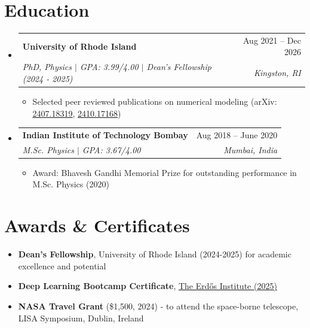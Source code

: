 \documentclass[letterpaper,10pt]{article}
\makeatletter
\newcommand{\resumeItem}[1]{
  \item\small{
    {#1 \vspace{-2pt}}
  }
}
\newcommand{\resumeSubheading}[4]{
  \vspace{-2pt}\item
    \begin{tabular*}{0.97\textwidth}[t]{l@{\extracolsep{\fill}}r}
      \textbf{#1} & #2 \\
      \textit{\small#3} & \textit{\small #4} \\
    \end{tabular*}\vspace{-7pt}
}
\newcommand{\resumeSubHeadingListStart}{\begin{itemize}[leftmargin=0.15in, label={}]}
\newcommand{\resumeSubHeadingListEnd}{\end{itemize}}
\newcommand{\resumeItemListStart}{\begin{itemize}}
\newcommand{\resumeItemListEnd}{\end{itemize}\vspace{-5pt}}
\makeatother
\begin{document}
\section{Education}
  \resumeSubHeadingListStart
    \resumeSubheading
      {University of Rhode Island}{Aug 2021 -- Dec 2026}
      {PhD, Physics $|$ GPA: 3.99/4.00 $|$ Dean's Fellowship (2024 - 2025)}{Kingston, RI}
      \resumeItemListStart
        \resumeItem{Selected peer reviewed publications on numerical modeling 
        (arXiv: \href{https://arxiv.org/abs/2407.18319}{\underline{2407.18319}}, 
        \href{https://arxiv.org/abs/2410.17168}{\underline{2410.17168}})}
      \resumeItemListEnd
    \resumeSubheading
      {Indian Institute of Technology Bombay}{Aug 2018 -- June 2020}
      {M.Sc. Physics $|$ GPA: 3.67/4.00}{Mumbai, India}
      \resumeItemListStart
        \resumeItem{Award: Bhavesh Gandhi Memorial Prize for outstanding performance in M.Sc. Physics (2020)}
      \resumeItemListEnd
  \resumeSubHeadingListEnd

\section{Awards \& Certificates}
  \begin{itemize}[leftmargin=0.15in, label={}, noitemsep]
      \item \textbf{Dean's Fellowship}, University of Rhode Island (2024-2025) for academic excellence and potential
      \item \textbf{Deep Learning Bootcamp Certificate},
      \href{https://www.erdosinstitute.org/certificates/fall-2025/deep-learning-boot-camp/ritesh-bachhar/c453e3ff-c2cb-470c-af89-549bedad8fc4}{\underline{The Erd\H{o}s Institute (2025)}}
      \item \textbf{NASA Travel Grant} (\$1,500, 2024) - to attend the space-borne telescope, LISA Symposium, Dublin, Ireland
  \end{itemize}



\end{document}
